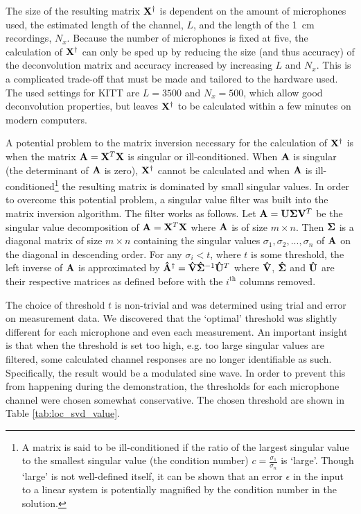 \documentclass[11pt,titlepage]{report}
\begin{document}
The size of the resulting matrix $\mathbf{X}^\dagger$ is dependent on the amount of microphones used, the estimated length of the channel, $L$, and the length of the \SI{1}{cm} recordings, $N_x$. Because the number of microphones is fixed at five, the calculation of $\mathbf{X}^\dagger$ can only be sped up by reducing the size (and thus accuracy) of the deconvolution matrix and accuracy increased by increasing $L$ and $N_x$. This is a complicated trade-off that must be made and tailored to the hardware used. The used settings for KITT are $L=3500$ and $N_x=500$, which allow good deconvolution properties, but leaves $\mathbf{X}^\dagger$ to be calculated within a few minutes on modern computers.

A potential problem to the matrix inversion necessary for the calculation of $\mathbf{X}^\dagger$ is when the matrix $\mathbf{A}=\mathbf{X}^T\mathbf{X}$ is singular or ill-conditioned. When $\mathbf{A}$ is singular (the determinant of $\mathbf{A}$ is zero), $\mathbf{X}^\dagger$ cannot be calculated and when $\mathbf{A}$ is ill-conditioned\footnote{A matrix is said to be ill-conditioned if the ratio of the largest singular value to the smallest singular value (the condition number) $c=\frac{\sigma_1}{\sigma_n}$ is `large'. Though `large' is not well-defined itself, it can be shown \cite{epo4-manual} that an error $\epsilon$ in the input to a linear system is potentially magnified by the condition number in the solution.} the resulting matrix is dominated by small singular values. In order to overcome this potential problem, a singular value filter was built into the matrix inversion algorithm. The filter works as follows.
Let $\mathbf{A}=\mathbf{U}\mathbf{\Sigma}\mathbf{V}^T$ be the singular value decomposition of $\mathbf{A}=\mathbf{X}^T\mathbf{X}$ where $\mathbf{A}$ is of size $m\times n$. Then $\mathbf{\Sigma}$ is a diagonal matrix of size $m \times n$ containing the singular values $\sigma_1, \sigma_2, ..., \sigma_n$ of $\mathbf{A}$ on the diagonal in descending order. For any $\sigma_i<t$, where $t$ is some threshold, the left inverse of $\mathbf{A}$ is approximated by $\mathbf{\hat{A}}^\dagger=\mathbf{\hat{V}}\mathbf{\hat{\Sigma}}^{-1}\mathbf{\hat{U}}^T$ where $\mathbf{\hat{V}}$, $\mathbf{\hat{\Sigma}}$ and $\mathbf{\hat{U}}$ are their respective matrices as defined before with the $i^\text{th}$ columns removed. 

The choice of threshold $t$ is non-trivial and was determined using trial and error on measurement data. We discovered that the `optimal' threshold was slightly different for each microphone and even each measurement. An important insight is that when the threshold is set too high, e.g. too large singular values are filtered, some calculated channel responses are no longer identifiable as such. Specifically, the result would be a modulated sine wave. In order to prevent this from happening during the demonstration, the thresholds for each microphone channel were chosen somewhat conservative. The chosen threshold are shown in Table \ref{tab:loc_svd_value}.
\end{document}
